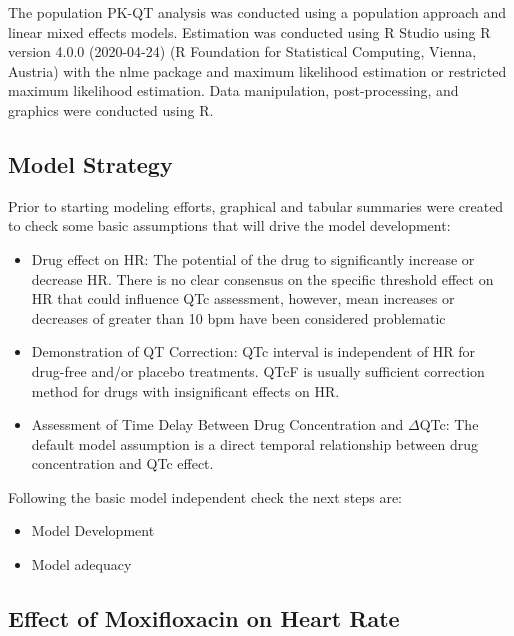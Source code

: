 \documentclass[
]{article}
\begin{document}
The population PK-QT analysis was conducted using a population approach
and linear mixed effects models. Estimation was conducted using R Studio
using R version 4.0.0 (2020-04-24) (R Foundation for Statistical
Computing, Vienna, Austria) \citep{Team2014} with the nlme package
\citep{bib:nlme} and maximum likelihood estimation or restricted maximum
likelihood estimation. Data manipulation, post-processing, and graphics
were conducted using R.

\hypertarget{model-strategy}{%
\subsection{\texorpdfstring{Model Strategy
\label{sec:strategy}}{Model Strategy }}\label{model-strategy}}

Prior to starting modeling efforts, graphical and tabular summaries were
created to check some basic assumptions that will drive the model
development:

\begin{itemize}
\item
  Drug effect on HR: The potential of the drug to significantly increase
  or decrease HR. There is no clear consensus on the specific threshold
  effect on HR that could influence QTc assessment, however, mean
  increases or decreases of greater than 10 bpm have been considered
  problematic \citep{Garnett2012-kw}
\item
  Demonstration of QT Correction: QTc interval is independent of HR for
  drug-free and/or placebo treatments. QTcF is usually sufficient
  correction method for drugs with insignificant effects on HR.
\item
  Assessment of Time Delay Between Drug Concentration and \(\Delta\)QTc:
  The default model assumption is a direct temporal relationship between
  drug concentration and QTc effect.
\end{itemize}

Following the basic model independent check the next steps are:

\begin{itemize}
\item
  Model Development
\item
  Model adequacy
\end{itemize}

\hypertarget{effect-of-moxifloxacin-on-heart-rate}{%
\subsection{Effect of Moxifloxacin on Heart
Rate}\label{effect-of-moxifloxacin-on-heart-rate}}
\end{document}
